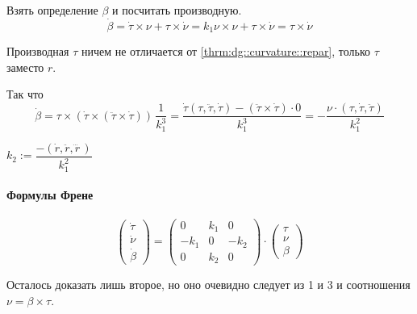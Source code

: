 \documentclass[draft,timbord]{longnotes}
\begin{document}
\begin{tproof}
  Взять определение $\beta$ и посчитать производную.
  \[
    \dot \beta  = \dot \tau \times \nu + \tau \times \dot \nu 
    = k_1 \nu \times \nu + \tau \times \dot \nu  = \tau \times \dot \nu 
  \]

  Производная $\tau$ ничем не отличается от \ref{thrm:dg::curvature::repar}, 
  только $\tau$ заместо $r$.
  
  Так что
  \[
    \dot \beta = \tau\times(\dot \tau \times(\ddot\tau \times \dot\tau))\,\frac{1}{k_1^3}
    = \frac{\dot\tau (\tau, \ddot \tau , \dot \tau) -(\ddot\tau \times \dot\tau)\cdot 0 }{k_1^3} 
    = -\frac{\nu \cdot (\tau, \dot \tau , \ddot \tau)  }{k_1^2} 
  \]
\end{tproof}

\begin{defn}[Кручение]\label{defn:dg::norm::crvn}
  $k_2 := \dfrac{-(\dot r, \ddot r, \dddot r\,)}{k_1^2}$
\end{defn}

\paragraph{Формулы Френе}
\label{par:dg::frene}

\begin{thrm}\label{thrm:dg::frene}
  \begin{equation}
    \label{eq:dg::frene}
    \begin{pmatrix}
      \dot\tau \\\dot\nu \\ \dot\beta
    \end{pmatrix}
    = 
    \begin{pmatrix}
      0 & k_1 & 0 \\
      -k_1 & 0 & -k_2 \\
      0 & k_2 & 0
    \end{pmatrix}\cdot
    \begin{pmatrix}
      \tau \\ \nu \\ \beta
    \end{pmatrix}
  \end{equation}
\end{thrm}

\begin{tproof}
  Осталось доказать лишь второе, но оно очевидно следует из 1 и 3 и соотношения 
  $\nu = \beta \times \tau$.
\end{tproof}
\end{document}
